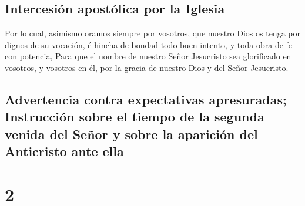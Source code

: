 \hypertarget{intercesiuxf3n-apostuxf3lica-por-la-iglesia}{%
\subsection{Intercesión apostólica por la
Iglesia}\label{intercesiuxf3n-apostuxf3lica-por-la-iglesia}}

 Por lo cual, asimismo oramos siempre por vosotros, que
nuestro Dios os tenga por dignos de su vocación, é hincha de bondad todo
buen intento, y toda obra de fe con potencia,  Para que el
nombre de nuestro Señor Jesucristo sea glorificado en vosotros, y
vosotros en él, por la gracia de nuestro Dios y del Señor Jesucristo.

\hypertarget{advertencia-contra-expectativas-apresuradas-instrucciuxf3n-sobre-el-tiempo-de-la-segunda-venida-del-seuxf1or-y-sobre-la-apariciuxf3n-del-anticristo-ante-ella}{%
\subsection{Advertencia contra expectativas apresuradas; Instrucción
sobre el tiempo de la segunda venida del Señor y sobre la aparición del
Anticristo ante
ella}\label{advertencia-contra-expectativas-apresuradas-instrucciuxf3n-sobre-el-tiempo-de-la-segunda-venida-del-seuxf1or-y-sobre-la-apariciuxf3n-del-anticristo-ante-ella}}

\hypertarget{section-1}{%
\section{2}\label{section-1}}

